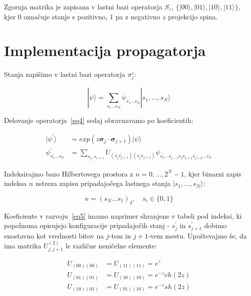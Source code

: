\documentclass[a4paper]{article}
\newcommand{\pauli}{\mathbf{\sigma}}
\newcommand{\ket}[1]{|#1\rangle}
\begin{document}
    Zgornja matrika je zapisana v lastni bazi operatorja $S_z$, $\{ |00\rangle, |01\rangle, |10\rangle, |11\rangle \}$,
    kjer $0$ označuje stanje s pozitivno, $1$ pa z negativno $z$ projekcijo spina.

	\section{Implementacija propagatorja}

    Stanja zapišimo v lastni bazi operatorja $\sigma_j^z$:

    \begin{equation}\label{eq5}
        \ket{\psi} = \sum_{s_1 \ldots s_N} \psi_{s_1 \ldots s_N} \ket{s_1, \ldots, s_N}
    \end{equation}

    Delovanje operatorja~\ref{eq4} sedaj obravnavamo po koeficientih:

    \begin{equation}\label{eq6}
        \begin{split}
            \ket{\psi^\prime} &= exp(z\pauli_{j} \cdot \pauli_{j+1}) \ket{\psi}\\
            \psi_{s_1^\prime \ldots s_N^\prime}^\prime &=
            \sum_{s_j, s_{s+1}} U_{(s_j^\prime s_{j+1}^\prime) (s_j s_{j+1})}
            \psi_{s_1^\prime \ldots s_{j-1}^\prime s_j s_{j+1} s_{j+2}^\prime \ldots s_N^\prime}
        \end{split}
    \end{equation}

    Indeksirajmo bazo Hilbertovega prostora z $n = 0, \ldots, 2^N - 1$, kjer binarni zapis indeksa $n$ ustreza zapisu
    pripadajočega lastnega stanja $|s_1, \ldots, s_N\rangle$:

    \begin{equation}\label{eq7}
        n = (s_N\ldots s_1)_2, \quad s_i \in \{ 0, 1 \}
    \end{equation}

    Koeficiente v razvoju~\ref{eq5} imamo naprimer shranjene v tabeli pod indeksi, ki popolnoma opisujejo konfiguracije
    pripadajočih stanj - $s_j^\prime$ in $s_{j+1}^\prime$ dobimo enostavno kot vrednosti bitov na $j$-tem in $j+1$-vem
    mestu.
    Upoštevajmo še, da ima matrika $U_{j, j+1}^{(2)}$ le različne neničelne elemente:

    \begin{equation}\label{eq8}
    \begin{split}
        U_{(00)(00)} &= U_{(11)(11)} = e^{z}\\
        U_{(01)(01)} &= U_{(10)(10)} = e^{-z}ch(2z)\\
        U_{(10)(01)} &= U_{(01)(10)} = e^{-z}sh(2z)
    \end{split}
    \end{equation}
\end{document}
